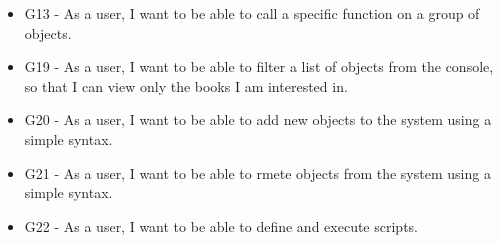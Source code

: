 \begin{itemize}
\item G13 - As a user, I want to be able to call a specific function on a group of objects.
\item G19 - As a user, I want to be able to filter a list of objects from the console, so that I can view only the books I am interested in.
\item G20 - As a user, I want to be able to add new objects to the system using a simple syntax.
\item G21 - As a user, I want to be able to rmete objects from the system using a simple syntax.
\item G22 - As a user, I want to be able to define and execute scripts.
\end{itemize}

